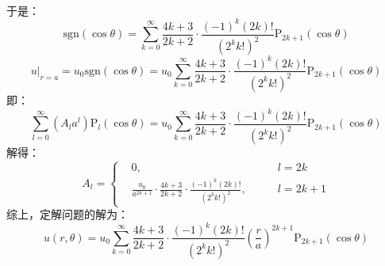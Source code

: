 \documentclass[fontset=windows]{ctexart}
\begin{document}
\begin{itemize}
\begin{align*}
    \end{align*}
    于是：
    \[
    \mathrm{sgn}(\cos\theta) = \sum_{k=0}^{\infty}\frac{4k+3}{2k+2}\cdot\frac{(-1)^k (2k)!}{\left(2^{k}k!\right)^2}\mathrm{P}_{2k+1}(\cos\theta)
    \]
    \[
    \left.u\right|_{r=a} = u_0\mathrm{sgn}(\cos\theta) = u_0\sum_{k=0}^{\infty}\frac{4k+3}{2k+2}\cdot\frac{(-1)^k (2k)!}{\left(2^{k}k!\right)^2}\mathrm{P}_{2k+1}(\cos\theta)
    \]
    即：
    \[
    \sum_{l=0}^{\infty}(A_l a^l)\mathrm{P}_l(\cos\theta) = u_0\sum_{k=0}^{\infty}\frac{4k+3}{2k+2}\cdot\frac{(-1)^k (2k)!}{\left(2^{k}k!\right)^2}\mathrm{P}_{2k+1}(\cos\theta)
    \]
    解得：
    \[
    A_l = \left\{
    \begin{aligned}
        &0,\qquad &l = 2k \\
        &\frac{u_0}{a^{2k+1}}\cdot\frac{4k+3}{2k+2}\cdot\frac{(-1)^k (2k)!}{\left(2^{k}k!\right)^2},\qquad &l = 2k+1
    \end{aligned}
    \right.
    \]
    综上，定解问题的解为：
    \[
    u(r,\theta) = u_0\sum_{k=0}^{\infty}\frac{4k+3}{2k+2}\cdot\frac{(-1)^k (2k)!}{\left(2^{k}k!\right)^2}\left(\frac{r}{a}\right)^{2k+1}\mathrm{P}_{2k+1}(\cos\theta)
    \]
    \bigskip


\end{itemize}
\end{document}
